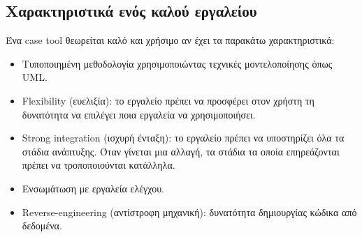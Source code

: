 \subsection{Χαρακτηριστικά ενός καλού εργαλείου}
Ένα case tool θεωρείται καλό και χρήσιμο αν έχει τα παρακάτω χαρακτηριστικά:
\begin{itemize}
	\item Τυποποιημένη μεθοδολογία χρησιμοποιώντας τεχνικές μοντελοποίησης όπως \gls{UML}.
	\item Flexibility (ευελιξία): το εργαλείο πρέπει να προσφέρει στον χρήστη τη δυνατότητα να επιλέγει ποια εργαλεία να χρησιμοποιήσει.
	\item Strong integration (ισχυρή ένταξη): το εργαλείο πρέπει να υποστηρίζει όλα τα στάδια ανάπτυξης. Όταν γίνεται μια αλλαγή, τα στάδια τα οποία επηρεάζονται πρέπει να τροποποιούνται κατάλληλα.
	\item Ενσωμάτωση με εργαλεία ελέγχου.
	\item Reverse-engineering (αντίστροφη μηχανική): δυνατότητα δημιουργίας κώδικα από δεδομένα.
\end{itemize}

	
